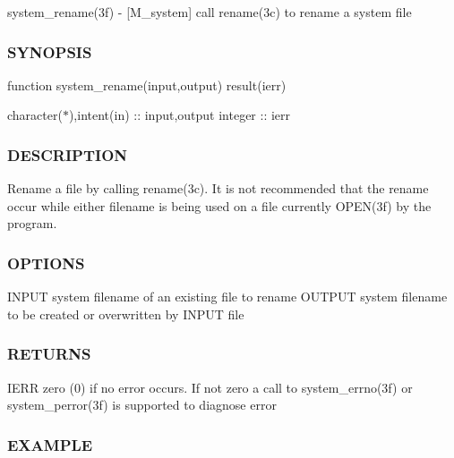 system\+\_\+rename(3f) -\/ \mbox{[}M\+\_\+system\mbox{]} call rename(3c) to rename a system file \subsubsection*{S\+Y\+N\+O\+P\+S\+IS}

function system\+\_\+rename(input,output) result(ierr)

character($\ast$),intent(in) \+:\+: input,output integer \+:\+: ierr \subsubsection*{D\+E\+S\+C\+R\+I\+P\+T\+I\+ON}

Rename a file by calling rename(3c). It is not recommended that the rename occur while either filename is being used on a file currently O\+P\+E\+N(3f) by the program. \subsubsection*{O\+P\+T\+I\+O\+NS}

I\+N\+P\+UT system filename of an existing file to rename O\+U\+T\+P\+UT system filename to be created or overwritten by I\+N\+P\+UT file \subsubsection*{R\+E\+T\+U\+R\+NS}

I\+E\+RR zero (0) if no error occurs. If not zero a call to system\+\_\+errno(3f) or system\+\_\+perror(3f) is supported to diagnose error \subsubsection*{E\+X\+A\+M\+P\+LE}

